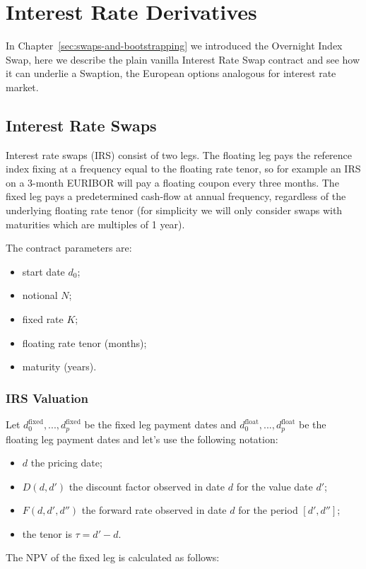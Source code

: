 \chapter{Interest Rate Derivatives}
\label{interest-rate-swaps-and-swaptions}

In Chapter~\ref{sec:swaps-and-bootstrapping} we introduced the Overnight Index Swap, here we describe the plain vanilla Interest Rate Swap contract and see how it can underlie a Swaption, the European options analogous for interest rate market.

\section{Interest Rate Swaps}\label{sec:interest-rate-swaps}

Interest rate swaps (IRS) consist of two legs. The floating leg pays the reference index fixing at a frequency equal to the floating rate tenor, so for example an IRS on a 3-month EURIBOR will pay a floating coupon every three months.
The fixed leg pays a predetermined cash-flow at annual frequency, regardless of the underlying floating rate tenor (for simplicity we will only consider swaps with maturities which are multiples of 1 year).

The contract parameters are:

\begin{itemize}
\tightlist
\item start date $d_0$;
\item notional $N$;
\item fixed rate $K$;
\item floating rate tenor (months);
\item maturity (years).
\end{itemize}

\subsection{IRS Valuation}
\label{irs-valuation}

Let $d_0^{\mathrm{fixed}},...,d_p^{\mathrm{fixed}}$ be the fixed leg payment dates and $d_0^{\mathrm{float}},...,d_p^{\mathrm{float}}$ be the floating leg payment dates and let's use the following notation:

\begin{itemize}
\tightlist
\item $d$ the pricing date;
\item $D(d, d')$ the discount factor observed in date $d$ for the value date $d'$;
\item $F(d, d', d'')$ the forward rate observed in date $d$ for the period $[d', d'']$;
\item the tenor is $\tau = d' - d$.
\end{itemize}
The NPV of the fixed leg is calculated as follows:

